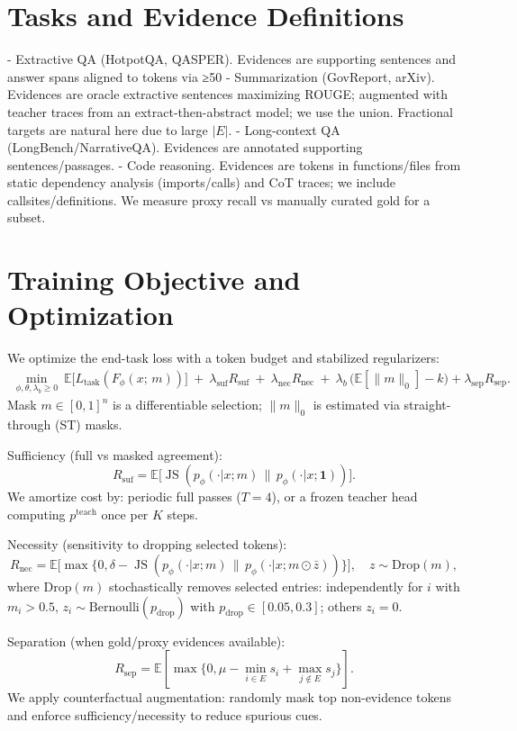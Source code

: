 \documentclass[11pt]{article}
\begin{document}
\section{Tasks and Evidence Definitions}
- Extractive QA (HotpotQA, QASPER). Evidences are supporting sentences and answer spans aligned to tokens via ≥50%
- Summarization (GovReport, arXiv). Evidences are oracle extractive sentences maximizing ROUGE; augmented with teacher traces from an extract-then-abstract model; we use the union. Fractional targets are natural here due to large $|E|$.
- Long-context QA (LongBench/NarrativeQA). Evidences are annotated supporting sentences/passages.
- Code reasoning. Evidences are tokens in functions/files from static dependency analysis (imports/calls) and CoT traces; we include callsites/definitions. We measure proxy recall vs manually curated gold for a subset.

\section{Training Objective and Optimization}
We optimize the end-task loss with a token budget and stabilized regularizers:
\begin{align}
\min_{\phi,\theta,\lambda_b \ge 0} \ \mathbb{E}\big[L_{\text{task}}(F_\phi(x;\, m))\big] \ + \ \lambda_{\text{suf}} R_{\text{suf}} \ + \ \lambda_{\text{nec}} R_{\text{nec}} \ + \ \lambda_b \, \big(\mathbb{E}[\|m\|_0] - k\big) + \lambda_{\text{sep}} R_{\text{sep}}.
\label{eq:joint}
\end{align}
Mask $m\in[0,1]^n$ is a differentiable selection; $\|m\|_0$ is estimated via straight-through (ST) masks.

Sufficiency (full vs masked agreement):
\[
R_{\text{suf}}=\mathbb{E}\big[\operatorname{JS}(p_\phi(\cdot|x;m)\,\|\,p_\phi(\cdot|x;\mathbf{1}))\big].
\]
We amortize cost by: periodic full passes ($T{=}4$), or a frozen teacher head computing $p^\text{teach}$ once per $K$ steps.

Necessity (sensitivity to dropping selected tokens):
\[
R_{\text{nec}}=\mathbb{E}\big[\max\{0,\delta-\operatorname{JS}(p_\phi(\cdot|x;m)\,\|\,p_\phi(\cdot|x;m\odot \bar{z}))\}\big],\quad z\sim\text{Drop}(m),
\]
where Drop$(m)$ stochastically removes selected entries: independently for $i$ with $m_i{>}0.5$, $z_i\sim \text{Bernoulli}(p_{\text{drop}})$ with $p_{\text{drop}}\in[0.05,0.3]$; others $z_i{=}0$.

Separation (when gold/proxy evidences available):
\[
R_{\text{sep}}=\mathbb{E}\left[\max\{0, \mu - \min_{i\in E}s_i + \max_{j\notin E} s_j\}\right].
\]
We apply counterfactual augmentation: randomly mask top non-evidence tokens and enforce sufficiency/necessity to reduce spurious cues.
\end{document}
